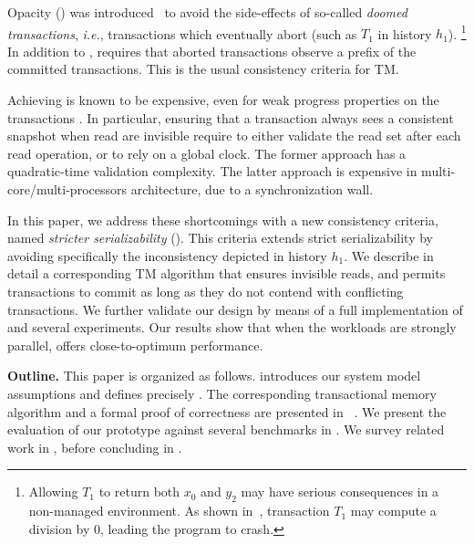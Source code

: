 Opacity (\OPA) was introduced~\cite{guerraoui2008correctness} to avoid the side-effects of so-called \emph{doomed transactions}, \emph{i.e.}, transactions which eventually abort (such as $T_1$ in history $h_1$).%
\footnote{
  Allowing $T_1$ to return both $x_0$ and $y_2$ may have serious consequences in a non-managed environment.
  As shown in~\cite{guerraoui2008correctness}, transaction $T_1$ may compute a division by $0$, leading the program to crash.
}
In addition to \SSER, \OPA requires that aborted transactions observe a prefix of the committed transactions.
This is the usual consistency criteria for TM.

Achieving \OPA is known to be expensive, even for weak progress properties on the transactions \cite{Ravi17}.
In particular, ensuring that a transaction always sees a consistent snapshot when read are invisible require to either validate the read set after each read operation, or to rely on a global clock.
The former approach has a quadratic-time validation complexity.
The latter approach is expensive in multi-core/multi-processors architecture, due to a synchronization wall.

In this paper, we address these shortcomings with a new consistency criteria, named \emph{stricter serializability} (\SPSER).
This criteria extends strict serializability by avoiding specifically the inconsistency depicted in history $h_1$.
We describe in detail a corresponding TM algorithm that ensures invisible reads, and permits transactions to commit as long as they do not contend with conflicting transactions.
We further validate our design by means of a full implementation of \SPSER and several experiments.
Our results show that when the workloads are strongly parallel, \SPSER offers close-to-optimum performance.

\textbf{Outline.}
This paper is organized as follows.
 introduces our system model assumptions and defines precisely \SPSER.
The corresponding transactional memory algorithm and a formal proof of correctness are presented in ~.
We present the evaluation of our prototype against several benchmarks in .
We survey related work in , before concluding in .
